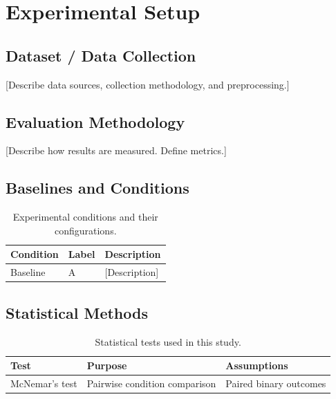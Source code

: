 
\chapter{Experimental Setup}
\label{ch:experimental_setup}

\section{Dataset / Data Collection}
\label{sec:ch4:dataset}

[Describe data sources, collection methodology, and preprocessing.]

\section{Evaluation Methodology}
\label{sec:ch4:evaluation}

[Describe how results are measured. Define metrics.]

\section{Baselines and Conditions}
\label{sec:ch4:baselines}

\begin{table}[htbp]
\centering
\caption{Experimental conditions and their configurations.}
\label{tab:ch4:conditions}
\begin{tabular}{llp{7cm}}
\toprule
\textbf{Condition} & \textbf{Label} & \textbf{Description} \\
\midrule
Baseline & A & [Description] \\
\bottomrule
\end{tabular}
\end{table}

\section{Statistical Methods}
\label{sec:ch4:stats}

\begin{table}[htbp]
\centering
\caption{Statistical tests used in this study.}
\label{tab:ch4:stats}
\begin{tabular}{lp{5cm}p{5cm}}
\toprule
\textbf{Test} & \textbf{Purpose} & \textbf{Assumptions} \\
\midrule
McNemar's test & Pairwise condition comparison & Paired binary outcomes \\
\bottomrule
\end{tabular}
\end{table}
